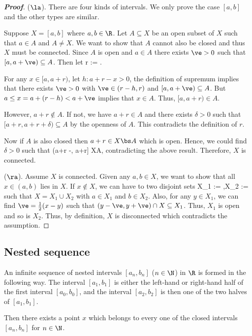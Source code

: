 \begin{proof}[\bf Proof]
($\la$). There are four kinds of intervals. We only prove the case $[a,b]$ and the other types are similar.

Suppose $X = [a,b]$ where $a,b\in \R$. Let $A \subseteq X$ be an open subset of $X$ such that $a\in A$ and $A\neq X$. We want to show that $A$ cannot also be closed and thus $X$ must be connected. Since $A$ is open and $a\in A$ there exists $\ve>0$ such that $[a,a+\ve) \subseteq A$. Then let
\be
r := \sup\bra{\ve: [a,a+\ve)\subseteq A}.
\ee

For any $x\in [a,a+r)$, let $h: a+r -x>0$, the definition of supremum implies that there exists $\ve>0$ with $\ve \in (r-h,r)$ and $[a,a+\ve) \subseteq A$. But $a\leq x = a+ (r-h) < a + \ve$ implies that $x \in A$. Thus, $[a,a+r) \in A$.

However, $a+r\notin A$. If not, we have $a+r\in A$ and there exists $\delta >0$ such that $[a+r,a+r+\delta)\subseteq A$ by the openness of $A$. This contradicts the definition of $r$.

Now if $A$ is also closed then $a+r \in X\bs A$ which is open. Hence, we could find $\delta >0$ such that
\be
(a+r -\delta, a+r] \subseteq X\bs A,
\ee
contradicting the above result. Therefore, $X$ is connected.

($\ra$). Assume $X$ is connected. Given any $a,b\in X$, we want to show that all $x\in (a,b)$ lies in $X$. If $x\notin X$, we can have to two disjoint sets
\be
X_1 := ,\qquad X_2 := 
\ee
such that $X = X_1\cup X_2$ with $a\in X_1$ and $b\in X_2$. Also, for any $y\in X_1$, we can find $\ve = \frac 12 (x-y)$ such that $(y-\ve,y+\ve)\cap X \subseteq X_1$. Thus, $X_1$ is open and so is $X_2$. Thus, by definition, $X$ is disconnected which contradicts the assumption.%
\end{proof}




\subsection{Nested sequence}

\begin{proposition}\label{pro:interval_binary_division_common_point}
An infinite sequence of nested intervals $[a_n,b_n]$ ($n\in \N$) in $\R$ is formed in the following way. The interval $[a_1,b_1]$ is either the left-hand or right-hand half of the first interval $[a_0,b_0]$, and the interval $[a_2,b_2]$ is then one of the two halves of $[a_1,b_1]$.

Then there exists a point $x$ which belongs to every one of the closed intervals $[a_n,b_n]$ for $n\in \N$.
\end{proposition}

